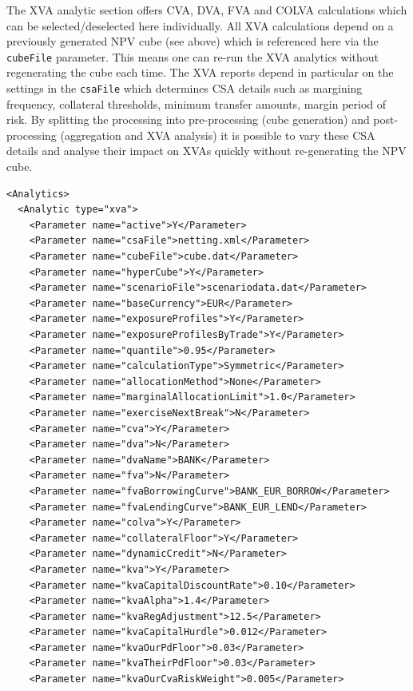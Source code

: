 \documentclass[12pt, a4paper]{article}
\begin{document}
{\medskip The XVA analytic section offers CVA, DVA, FVA and COLVA calculations which can be selected/deselected here
individually. All XVA calculations depend on a previously generated NPV cube (see above) which is referenced here via
the {\tt cubeFile} parameter. This means one can re-run the XVA analytics without regenerating the cube each time. The
XVA reports depend in particular on the settings in the {\tt csaFile} which determines CSA details such as margining
frequency, collateral thresholds, minimum transfer amounts, margin period of risk. By splitting the processing into
pre-processing (cube generation) and post-processing (aggregation and XVA analysis) it is possible to vary these CSA
details and analyse their impact on XVAs quickly without re-generating the NPV cube.

\begin{listing}[H]
\begin{verbatim}
<Analytics>
  <Analytic type="xva">
    <Parameter name="active">Y</Parameter>
    <Parameter name="csaFile">netting.xml</Parameter>
    <Parameter name="cubeFile">cube.dat</Parameter>
    <Parameter name="hyperCube">Y</Parameter>
    <Parameter name="scenarioFile">scenariodata.dat</Parameter>
    <Parameter name="baseCurrency">EUR</Parameter>
    <Parameter name="exposureProfiles">Y</Parameter>
    <Parameter name="exposureProfilesByTrade">Y</Parameter>
    <Parameter name="quantile">0.95</Parameter>
    <Parameter name="calculationType">Symmetric</Parameter>      
    <Parameter name="allocationMethod">None</Parameter>    
    <Parameter name="marginalAllocationLimit">1.0</Parameter>
    <Parameter name="exerciseNextBreak">N</Parameter>
    <Parameter name="cva">Y</Parameter>
    <Parameter name="dva">N</Parameter>
    <Parameter name="dvaName">BANK</Parameter>
    <Parameter name="fva">N</Parameter>
    <Parameter name="fvaBorrowingCurve">BANK_EUR_BORROW</Parameter>
    <Parameter name="fvaLendingCurve">BANK_EUR_LEND</Parameter>
    <Parameter name="colva">Y</Parameter>
    <Parameter name="collateralFloor">Y</Parameter>
    <Parameter name="dynamicCredit">N</Parameter>
    <Parameter name="kva">Y</Parameter>
    <Parameter name="kvaCapitalDiscountRate">0.10</Parameter>
    <Parameter name="kvaAlpha">1.4</Parameter>
    <Parameter name="kvaRegAdjustment">12.5</Parameter>
    <Parameter name="kvaCapitalHurdle">0.012</Parameter>
    <Parameter name="kvaOurPdFloor">0.03</Parameter>
    <Parameter name="kvaTheirPdFloor">0.03</Parameter>
    <Parameter name="kvaOurCvaRiskWeight">0.005</Parameter>

\end{verbatim}
\end{listing}}
\end{document}
